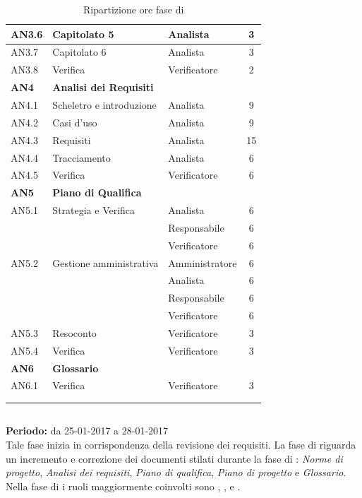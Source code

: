 \begin{longtable}{|l|l|l|c|}
      	{AN3.6} & {Capitolato 5} & Analista  & 3 \\
      	\hline
      	{AN3.7} & {Capitolato 6} & Analista  & 3 \\
      	\hline
      	{AN3.8} & {Verifica} & Verificatore  & 2 \\
      \hline
      \textbf{AN4} & \textbf{Analisi dei Requisiti} & &  \\
         \hline
         {AN4.1} & {Scheletro e introduzione} & Analista  &  9\\
         \hline
         {AN4.2} & {Casi d'uso} & Analista  &  9\\
         \hline
         {AN4.3} & {Requisiti} & Analista  &  15\\
         \hline
         {AN4.4} & {Tracciamento} & Analista  &  6\\
         \hline
         {AN4.5} & {Verifica} & Verificatore  & 6\\
     \hline
     \textbf{AN5} & \textbf{Piano di Qualifica} & &  \\
         \hline
         {AN5.1} & {Strategia e Verifica} & Analista &  6 \\
         & & Responsabile & 6\\
         & & Verificatore & 6\\
         \hline
         {AN5.2} & {Gestione amministrativa} & Amministratore & 6\\
         & & Analista & 6\\
         & & Responsabile & 6\\
         & & Verificatore & 6\\
         \hline
         {AN5.3} & {Resoconto} & Verificatore &  3\\
         \hline
         {AN5.4} & {Verifica} & Verificatore &  3 \\
     \hline
     \textbf{AN6} & \textbf{Glossario} & &  \\
         \hline
         {AN6.1} & {Verifica} & Verificatore &  3 \\
         \hline
     \\
     \caption{Ripartizione ore fase di \AR{}}
\end{longtable}
\egroup
  
\subsection{\AD{}}
\textbf{Periodo:} da 25-01-2017 a 28-01-2017 \\
Tale fase inizia in corrispondenza della revisione dei requisiti. La fase di \AD{} riguarda un incremento e correzione dei documenti stilati durante la fase di \AR{}: \textit{Norme di progetto}, \textit{Analisi dei requisiti}, \textit{Piano di qualifica}, \textit{Piano di progetto} e \textit{Glossario}.
Nella fase di \AD{} i ruoli maggiormente coinvolti sono \Analista{}, \Responsabile{}, \Amministratore{} e \Verificatore{}.

